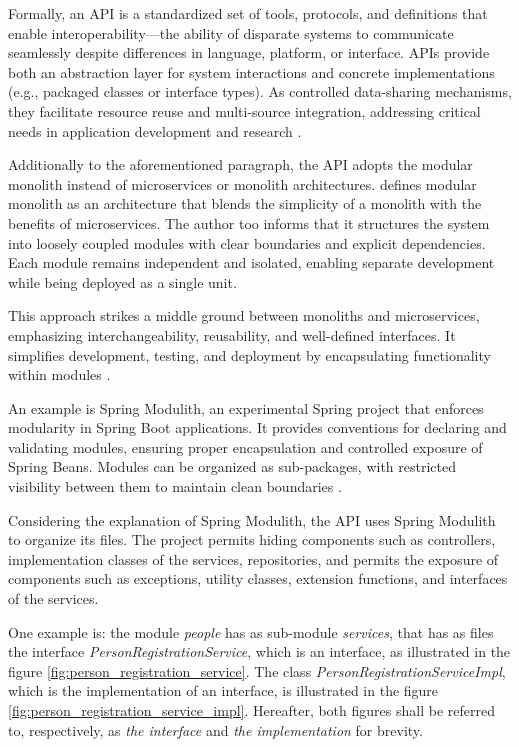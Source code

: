 Formally, an API is a standardized set of tools, protocols, and definitions that enable interoperability—the ability of disparate systems to communicate seamlessly despite differences in language, platform, or interface. APIs provide both an abstraction layer for system interactions and concrete implementations (e.g., packaged classes or interface types). As controlled data-sharing mechanisms, they facilitate resource reuse and multi-source integration, addressing critical needs in application development 
 and research 
 \cite{aksu2016visualization, dullabh2020application, hussain2020enterprise, matilainen2011multicore, mcguire2013publisher, 
 swaminathan2016review, wegner1996}.

Additionally to the aforementioned paragraph, the API adopts the modular monolith instead of microservices or monolith architectures. 
\cite{su2024modular} defines modular monolith as an architecture that blends the simplicity of a monolith with the benefits of microservices. The author too informs that it structures the system into loosely coupled modules with clear boundaries and explicit dependencies. Each module remains independent and isolated, enabling separate development while being deployed as a single unit.

This approach strikes a middle ground between monoliths and microservices, emphasizing interchangeability, reusability, and well-defined interfaces. It simplifies development, testing, and deployment by encapsulating functionality within modules \cite{su2024modular}.

An example is Spring Modulith, an experimental Spring project that enforces modularity in Spring Boot applications. It provides conventions for declaring and validating modules, ensuring proper encapsulation and controlled exposure of Spring Beans. Modules can be organized as sub-packages, with restricted visibility between them to maintain clean boundaries \cite{su2024modular}.

Considering the explanation of Spring Modulith, the API uses Spring Modulith to organize its files. The project permits hiding components such as controllers, implementation classes of the services, repositories, and permits the exposure of components such as exceptions, utility classes, extension functions, and interfaces of the services. 

One example is: the module \textit{people} has as sub-module \textit{services}, that has as files the interface 
\textit{PersonRegistrationService}, which is an interface, as illustrated in the figure \ref{fig:person_registration_service}. The class \textit{PersonRegistrationServiceImpl}, which is the implementation of an interface, is illustrated in the figure \ref{fig:person_registration_service_impl}. Hereafter, both figures shall be referred to, respectively, as \textit{the interface} and \textit{the implementation} for brevity.

